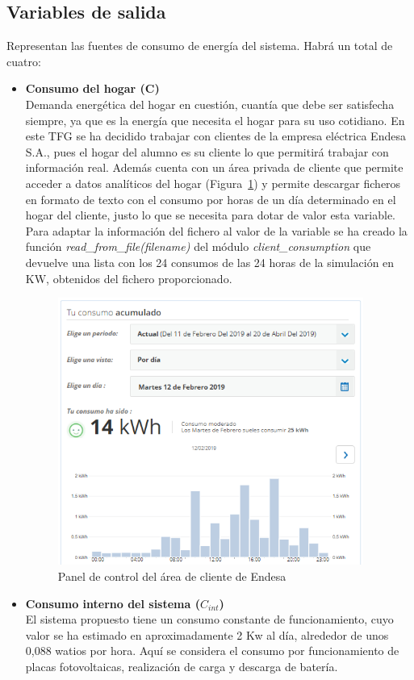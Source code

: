 \subsection{Variables de salida}
Representan las fuentes de consumo de energía del sistema. Habrá un total de cuatro:
\begin{itemize}
\item \textbf{Consumo del hogar (C)}\\Demanda energética del hogar en cuestión, cuantía que debe ser satisfecha siempre, ya que es la energía que necesita el hogar para su uso cotidiano. En este \gls{TFG} se ha decidido trabajar con clientes de la empresa eléctrica Endesa S.A., pues el hogar del alumno es su cliente lo que permitirá trabajar con información real. Además cuenta con un área privada de cliente que permite acceder a datos analíticos del hogar (Figura~\ref{fig:endesa}) y permite descargar ficheros en formato de texto con el consumo por horas de un día determinado en el hogar del cliente, justo lo que se necesita para dotar de valor esta variable. Para adaptar la información del fichero al valor de la variable se ha creado la función \textit{read\_from\_file(filename)} del módulo \textit{client\_consumption} que devuelve una lista con los 24 consumos de las 24 horas de la simulación en KW, obtenidos del fichero proporcionado.
  \begin{figure}[H]
    \centering
    \includegraphics[width=10cm]{figs/Endesa.PNG}
    \caption{Panel de control del área de cliente de Endesa}
    \label{fig:endesa}
  \end{figure}
\item \textbf{Consumo interno del sistema ($ C_{int} $)}\\El sistema propuesto tiene un consumo constante de funcionamiento, cuyo valor se ha estimado en aproximadamente 2 Kw al día, alrededor de unos 0,088 watios por hora. Aquí se considera el consumo por funcionamiento de placas fotovoltaicas, realización de carga y descarga de batería.

\end{itemize}
